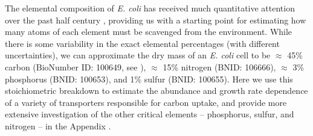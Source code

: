 The elemental composition of \textit{E. coli} has received much quantitative
attention over the past half century \citep{neidhardt1991,
taymaz-nikerel2010, heldal1985, bauer1976}, providing us with a starting
point for estimating how many atoms of each element must be scavenged from
the environment. While there is some variability in the exact elemental
percentages (with different uncertainties), we can approximate the dry mass
of an \textit{E. coli} cell to be $\approx$ 45\% carbon (BioNumber ID:
100649, see ), $\approx$ 15\% nitrogen (BNID: 106666),
$\approx$ 3\% phosphorus (BNID: 100653), and 1\% sulfur (BNID: 100655).
Here we use this stoichiometric breakdown to estimate the abundance and
growth rate dependence of a variety of transporters responsible for carbon
uptake, and provide more extensive investigation of the other critical elements --  phosphorus, sulfur,
and nitrogen -- in the Appendix .



